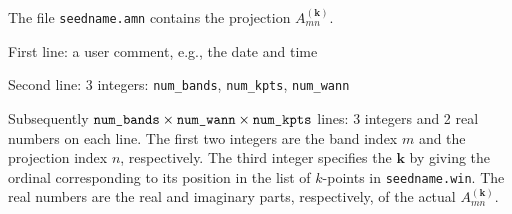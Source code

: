 The file \verb#seedname.amn# contains the projection
$A_{mn}^{(\mathbf{k})}$.

First line: a user comment, e.g., the date and time


Second line: 3 integers: \verb#num_bands#, \verb#num_kpts#, \verb#num_wann#

                                     
Subsequently
$\verb#num_bands#\times\verb#num_wann#\times\verb#num_kpts#$ 
lines: 3 integers and 2 real numbers on each line. The first 
two integers are the band index $m$ and the projection index $n$, respectively. The third integer specifies
the $\mathbf{k}$ by giving the ordinal corresponding to its position
in the list of $k$-points in \verb#seedname.win#. The real numbers
are the real and imaginary parts, respectively, of the actual
$A_{mn}^{(\mathbf{k})}$.



